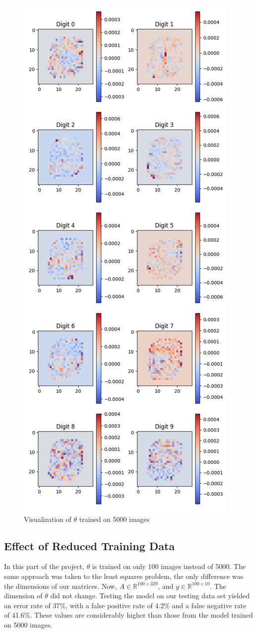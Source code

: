 \documentclass[conference]{IEEEtran}
\begin{document}
\begin{figure}
    \centering
    \includegraphics[width=0.75\linewidth]{theta_fig1.png}
    \caption{Visualization of $\theta$ trained on 5000 images}
    \label{fig:enter-label}
\end{figure}

\subsection{Effect of Reduced Training Data}
In this part of the project, $\theta$ is trained on only 100 images instead of 5000. The same approach was taken to the least squares problem, the only difference was the dimensions of our matrices. Now, $A \in \mathbb{R}^{100 \times 329}$, and $y \in \mathbb{R}^{100 \times 10}$. The dimension of $\theta$ did not change. Testing the model on our testing data set yielded an error rate of 37\%, with a false positive rate of 4.2\% and a false negative rate of 41.6\%. These values are considerably higher than those from the model trained on 5000 images. 
\end{document}
